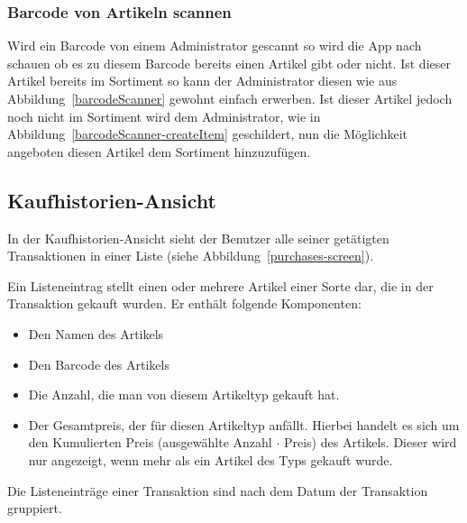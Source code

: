 \subsubsection{Barcode von Artikeln scannen} \label{subsubsec:shop-admin-scan-item}

Wird ein Barcode von einem Administrator gescannt so wird die App nach schauen ob es zu diesem Barcode bereits einen Artikel gibt oder nicht.
Ist dieser Artikel bereits im Sortiment so kann der Administrator diesen wie aus Abbildung~\ref{barcodeScanner} gewohnt einfach erwerben.
Ist dieser Artikel jedoch noch nicht im Sortiment wird dem Administrator, wie in Abbildung~\ref{barcodeScanner-createItem} geschildert, nun die Möglichkeit angeboten diesen Artikel dem Sortiment hinzuzufügen.


\subsection{Kaufhistorien-Ansicht} \label{subsec:purchases-screen}

In der Kaufhistorien-Ansicht sieht der Benutzer alle seiner getätigten Transaktionen in einer Liste (siehe Abbildung~\ref{purchases-screen}).

Ein Listeneintrag stellt einen oder mehrere Artikel einer Sorte dar, die in der Transaktion gekauft wurden.
Er enthält folgende Komponenten:

\begin{itemize}
	\item Den Namen des Artikels

	\item Den Barcode des Artikels

	\item Die Anzahl, die man von diesem Artikeltyp gekauft hat.

	\item Der Gesamtpreis, der für diesen Artikeltyp anfällt.
	Hierbei handelt es sich um den Kumulierten Preis (ausgewählte Anzahl $\cdot$ Preis) des Artikels.
	Dieser wird nur angezeigt, wenn mehr als ein Artikel des Typs gekauft wurde.
\end{itemize}

Die Listeneinträge einer Transaktion sind nach dem Datum der Transaktion gruppiert.

